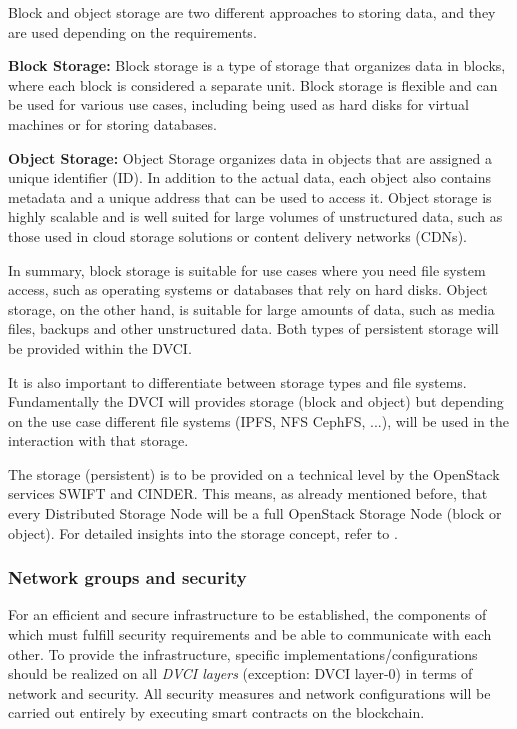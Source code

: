 \documentclass[]{article}
\begin{document}
Block and object storage are two different approaches to storing data, and they are used depending on the requirements.
\newline

\textbf{Block Storage:}
Block storage is a type of storage that organizes data in blocks, where each block is considered a separate unit. 
Block storage is flexible and can be used for various use cases, including being used as hard disks for virtual machines or for storing databases. 
\newline
	
\textbf{Object Storage:}
Object Storage organizes data in objects that are assigned a unique identifier (ID). 
In addition to the actual data, each object also contains metadata and a unique address that can be used to access it.
Object storage is highly scalable and is well suited for large volumes of unstructured data, such as those used in cloud storage solutions or content delivery networks (CDNs). 
\newline

In summary, block storage is suitable for use cases where you need file system access, such as operating systems or databases that rely on hard disks.
Object storage, on the other hand, is suitable for large amounts of data, such as media files, backups and other unstructured data.
Both types of persistent storage will be provided within the DVCI.

It is also important to differentiate between storage types and file systems.
Fundamentally the DVCI will provides storage (block and object) but depending on the use case different file systems (IPFS, NFS CephFS, ...), will be used in the interaction with that storage.

The storage (persistent) is to be provided on a technical level by the OpenStack services SWIFT and CINDER. 
This means, as already mentioned before, that every Distributed Storage Node will be a full OpenStack Storage Node (block or object).
For detailed insights into the storage concept, refer to \cite{OpenStackDoc-storage-concept}.

\subsubsection{Network groups and security}
For an efficient and secure infrastructure to be established, the components of which must fulfill security requirements and be able to communicate with each other.
To provide the infrastructure, specific implementations/configurations should be realized on all \textit{DVCI layers} (exception: DVCI layer-0) in terms of network and security.
All security measures and network configurations will be carried out entirely by executing smart contracts on the blockchain. 
\end{document}
